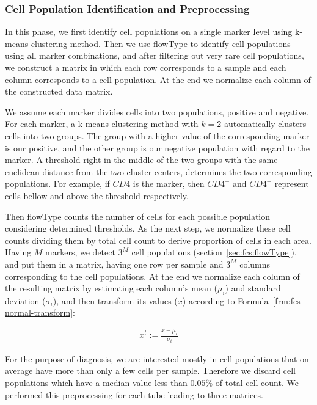\subsubsection{Cell Population Identification and Preprocessing}
In this phase, we first identify cell populations on a single marker level using k-means clustering method. Then we use flowType to identify cell populations using all marker combinations, and after filtering out very rare cell populations, we construct a matrix in which each row corresponds to a sample and each column corresponds to a cell population. At the end we normalize each column of the constructed data matrix.

We assume each marker divides cells into two populations, positive and negative. For each marker, a k-means clustering method with $k = 2$ automatically clusters cells into two groups. The group with a higher value of the corresponding marker is our positive, and the other group is our negative population with regard to the marker. A threshold right in the middle of the two groups with the same euclidean distance from the two cluster centers, determines the two corresponding populations. For example, if $CD4$ is the marker, then $CD4^-$ and $CD4^+$ represent cells bellow and above the threshold respectively.

Then flowType counts the number of cells for each possible population considering determined thresholds. As the next step, we normalize these cell counts dividing them by total cell count to derive proportion of cells in each area. Having $M$ markers, we detect $3^M$ cell populations (section~\ref{sec:fcs:flowType}), and put them in a matrix, having one row per sample and $3^M$ columns corresponding to the cell populations. At the end we normalize each column of the resulting matrix by estimating each column's mean ($\mu_i$) and standard deviation ($\sigma_i$), and then transform its values ($x$) according to Formula~\ref{frm:fcs-normal-transform}:

\begin{align}
  x^t := \frac{x - \mu_i}{\sigma_i}
  \label{frm:fcs-normal-transform}
\end{align}

For the purpose of diagnosis, we are interested mostly in cell populations that on average have more than only a few cells per sample. Therefore we discard cell populations which have a median value less than $0.05\%$ of total cell count. We performed this preprocessing for each tube leading to three matrices.

